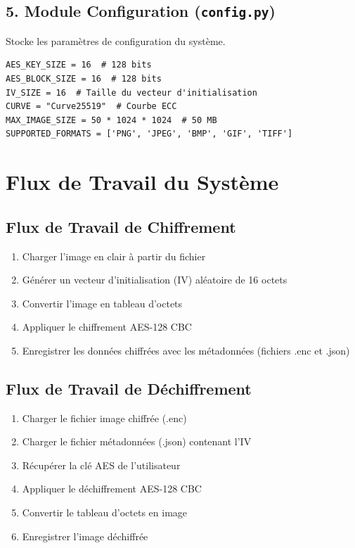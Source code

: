 \documentclass[12pt,a4paper]{report}
\begin{document}
\subsection{5. Module Configuration (\texttt{config.py})}

Stocke les paramètres de configuration du système.

\begin{lstlisting}[caption=Paramètres de Configuration]
AES_KEY_SIZE = 16  # 128 bits
AES_BLOCK_SIZE = 16  # 128 bits
IV_SIZE = 16  # Taille du vecteur d'initialisation
CURVE = "Curve25519"  # Courbe ECC
MAX_IMAGE_SIZE = 50 * 1024 * 1024  # 50 MB
SUPPORTED_FORMATS = ['PNG', 'JPEG', 'BMP', 'GIF', 'TIFF']
\end{lstlisting}

\section{Flux de Travail du Système}

\subsection{Flux de Travail de Chiffrement}

\begin{enumerate}
    \item Charger l'image en clair à partir du fichier
    \item Générer un vecteur d'initialisation (IV) aléatoire de 16 octets
    \item Convertir l'image en tableau d'octets
    \item Appliquer le chiffrement AES-128 CBC
    \item Enregistrer les données chiffrées avec les métadonnées (fichiers .enc et .json)
\end{enumerate}

\subsection{Flux de Travail de Déchiffrement}

\begin{enumerate}
    \item Charger le fichier image chiffrée (.enc)
    \item Charger le fichier métadonnées (.json) contenant l'IV
    \item Récupérer la clé AES de l'utilisateur
    \item Appliquer le déchiffrement AES-128 CBC
    \item Convertir le tableau d'octets en image
    \item Enregistrer l'image déchiffrée
\end{enumerate}
\end{document}
